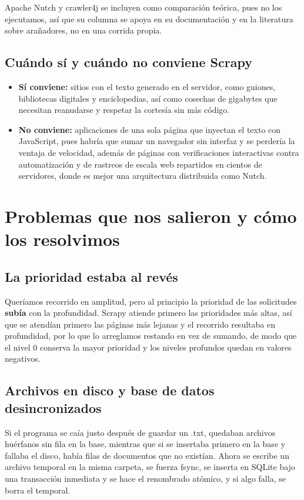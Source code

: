 \documentclass[11pt,spanish]{article}
\begin{document}
Apache Nutch y crawler4j se incluyen como comparación teórica, pues no los ejecutamos, así que su columna se apoya en su documentación y en la literatura sobre arañadores, no en una corrida propia.

\subsection{Cuándo sí y cuándo no conviene Scrapy}

\begin{itemize}[label=\textbullet, leftmargin=*]
    \item \textbf{Sí conviene:} sitios con el texto generado en el servidor, como guiones, bibliotecas digitales y enciclopedias, así como cosechas de gigabytes que necesitan reanudarse y respetar la cortesía sin más código.
    \item \textbf{No conviene:} aplicaciones de una sola página que inyectan el texto con JavaScript, pues habría que sumar un navegador sin interfaz y se perdería la ventaja de velocidad, además de páginas con verificaciones interactivas contra automatización y de rastreos de escala web repartidos en cientos de servidores, donde es mejor una arquitectura distribuida como Nutch.
\end{itemize}

\section{Problemas que nos salieron y cómo los resolvimos}

\subsection{La prioridad estaba al revés}

Queríamos recorrido en amplitud, pero al principio la prioridad de las solicitudes \textbf{subía} con la profundidad. Scrapy atiende primero las prioridades más altas, así que se atendían primero las páginas más lejanas y el recorrido resultaba en profundidad, por lo que lo arreglamos restando en vez de sumando, de modo que el nivel 0 conserva la mayor prioridad y los niveles profundos quedan en valores negativos.

\subsection{Archivos en disco y base de datos desincronizados}

Si el programa se caía justo después de guardar un .txt, quedaban archivos huérfanos sin fila en la base, mientras que si se insertaba primero en la base y fallaba el disco, había filas de documentos que no existían. Ahora se escribe un archivo temporal en la misma carpeta, se fuerza fsync, se inserta en SQLite bajo una transacción inmediata y se hace el renombrado atómico, y si algo falla, se borra el temporal.
\end{document}
